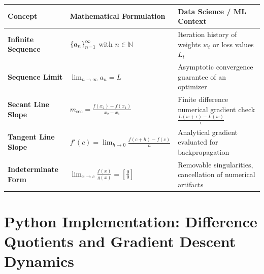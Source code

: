 \begin{center}
\renewcommand{\arraystretch}{1.3}
\begin{tabular}{p{3.2cm}p{4.0cm}p{4.2cm}}
\toprule
\textbf{Concept} & \textbf{Mathematical Formulation} & \textbf{Data Science / ML Context} \\
\midrule
\textbf{Infinite Sequence} & $\left\{a_n\right\}_{n=1}^\infty$ with $n \in \mathbb{N}$ & Iteration history of weights $w_t$ or loss values $L_t$ \\
\textbf{Sequence Limit} & $\lim_{n \to \infty} a_n = L$ & Asymptotic convergence guarantee of an optimizer \\
\textbf{Secant Line Slope} & $m_{\text{sec}} = \frac{f(x_2) - f(x_1)}{x_2 - x_1}$ & Finite difference numerical gradient check $\frac{L(w+\epsilon) - L(w)}{\epsilon}$ \\
\textbf{Tangent Line Slope} & $f'(c) = \lim_{h \to 0} \frac{f(c+h) - f(c)}{h}$ & Analytical gradient evaluated for backpropagation \\
\textbf{Indeterminate Form} & $\lim_{x \to c} \frac{f(x)}{g(x)} = \left[\frac{0}{0}\right]$ & Removable singularities, cancellation of numerical artifacts \\
\bottomrule
\end{tabular}
\end{center}

\section{Python Implementation: Difference Quotients and Gradient Descent Dynamics}

